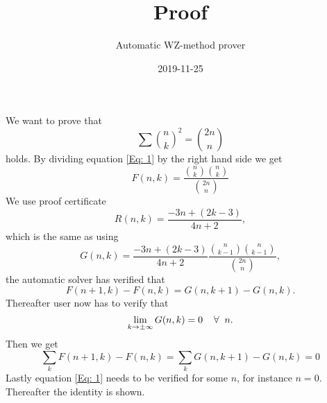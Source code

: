 \documentclass{article}
\title{Proof}
\author{Automatic WZ-method prover}
\date{2019-11-25}
\let\oldforall\forall
\renewcommand{\forall}{\hspace*{2mm}\oldforall\hspace*{1mm}}
\begin{document}
\maketitle
We want to prove that
\begin{equation}\label{Eq: 1}
\sum \binom{n}{k}^2 = \binom{2n}{n}
\end{equation}
holds. By dividing equation \ref{Eq: 1} by the right hand side we get
\begin{equation}
F(n,k)=\frac{\binom{n}{k}\binom{n}{k}}{\binom{2n}{n}}
\end{equation}
We use proof certificate
\begin{equation}
R(n,k)=\frac{-3n+(2k-3)}{4n+2},
\end{equation}
which is the same as using
\begin{equation}
G(n,k)=\frac{-3n+(2k-3)}{4n+2}\frac{\binom{n}{k-1}\binom{n}{k-1}}{\binom{2n}{n}},
\end{equation}
the automatic solver has  verified that
\begin{equation}\label{Eq: WZ1}
F(n+1,k)-F(n,k)=G(n,k+1)-G(n,k).
\end{equation}
Thereafter user now has to verify that
\begin{equation}
\lim_{k\to\pm\infty}G(n,k)=0\forall n.
\end{equation}
Then we get
\begin{equation}
\sum_k F(n+1,k)-F(n,k)=\sum_k G(n,k+1)-G(n,k)=0\end{equation}Lastly equation \ref{Eq: 1} needs to be verified for some $n$, for instance $n=0$. Thereafter the identity is shown.
\end{document}

